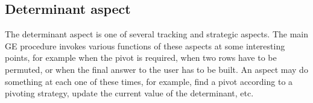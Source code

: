 \documentclass{elsart}
\begin{document}
\subsection{Determinant aspect}
\label{sec:det}

The determinant aspect is one of several tracking and strategic
aspects. The main GE procedure invokes various functions of these aspects at
some interesting points, for example when the pivot is required, when two rows
have to be permuted, or when the final answer to the user has to be
built. An aspect may do something at each one of these times, for
example, find a pivot according to a pivoting strategy, update the
current value of the determinant, etc.
\end{document}
